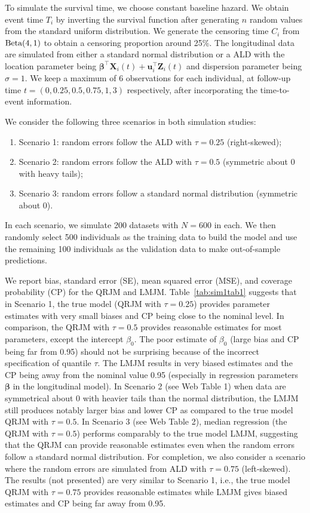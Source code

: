 \documentclass[Crown, sagev, times, doublespace]{sagej}
\begin{document}
To simulate the survival time, we choose constant baseline hazard. We obtain event time $T_i$ by inverting the survival function after generating $n$ random values from the standard uniform distribution. We generate the censoring time $C_i$ from $\textnormal{Beta}(4,1)$ to obtain a censoring proportion around 25\%. The longitudinal data are simulated from either a standard normal distribution or a ALD with the location parameter being $\boldsymbol{\beta}^{\top}{\boldsymbol X}_i(t) + {\boldsymbol u}_i^{\top}{\boldsymbol Z}_i(t)$ and dispersion parameter being $\sigma=1$. We keep a maximum of 6 observations for each individual, at follow-up time $t=(0, 0.25, 0.5, 0.75, 1, 3)$ respectively, after incorporating the time-to-event information.

We consider the following three scenarios in both simulation studies:
\begin{enumerate}
\item Scenario 1: random errors follow the ALD with $\tau=0.25$ (right-skewed);
\item Scenario 2: random errors follow the ALD with $\tau=0.5$ (symmetric about 0 with heavy tails);
\item Scenario 3: random errors follow a standard normal distribution (symmetric about 0).
\end{enumerate}

In each scenario, we simulate 200 datasets with $N=600$ in each. We then randomly select 500 individuals as the training data to build the model and use the remaining 100 individuals as the validation data to make out-of-sample predictions.

We report bias, standard error (SE), mean squared error (MSE), and coverage probability (CP) for the QRJM and LMJM. Table~\ref{tab:sim1tab1} suggests that in Scenario 1, the true model (QRJM with $\tau=0.25$) provides parameter estimates with very small biases and CP being close to the nominal level. In comparison, the QRJM with $\tau=0.5$ provides reasonable estimates for most parameters, except the intercept $\beta_0$. The poor estimate of $\beta_0$ (large bias and CP being far from 0.95) should not be surprising because of the incorrect specification of quantile $\tau$. The LMJM results in very biased estimates and the CP being away from the nominal value 0.95 (especially in regression parameters $\boldsymbol{\beta}$ in the longitudinal model). In Scenario 2 (see Web Table 1) when data are symmetrical about 0 with heavier tails than the normal distribution, the LMJM still produces notably larger bias and lower CP as compared to the true model QRJM with $\tau=0.5$. In Scenario 3 (see Web Table 2), median regression (the QRJM with $\tau=0.5$) performs comparably to the true model LMJM, suggesting that the QRJM can provide reasonable estimates even when the random errors follow a standard normal distribution. For completion, we also consider a scenario where the random errors are simulated from ALD with $\tau=0.75$ (left-skewed). The results (not presented) are very similar to Scenario 1, i.e., the true model QRJM with $\tau=0.75$ provides reasonable estimates while LMJM gives biased estimates and CP being far away from 0.95.
\end{document}
